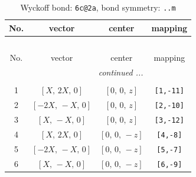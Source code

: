 \documentclass[fleqn,8pt]{jsarticle}
\begin{document}
\renewcommand{\arraystretch}{1.2}
\begin{longtable}{cccc}
\caption{Wyckoff bond: {\tt 6c@2a}, bond symmetry: {\tt ..m}}
 \\
 \hline \hline
No. & vector & center & mapping \\ \hline \endfirsthead

\multicolumn{3}{l}{\tablename\ \thetable{}} \\
 \hline \hline
No. & vector & center & mapping \\ \hline \endhead

 \hline \hline
\multicolumn{3}{r}{\footnotesize\it continued ...} \\ \endfoot

 \hline \hline
\multicolumn{3}{r}{} \\ \endlastfoot

1 & $\left[ X,\, 2 X,\, 0 \right]$ & $\left[ 0,\, 0,\, z \right]$ & {\tt [1,-11]} \\ \hline
2 & $\left[ - 2 X,\, - X,\, 0 \right]$ & $\left[ 0,\, 0,\, z \right]$ & {\tt [2,-10]} \\ \hline
3 & $\left[ X,\, - X,\, 0 \right]$ & $\left[ 0,\, 0,\, z \right]$ & {\tt [3,-12]} \\ \hline
4 & $\left[ X,\, 2 X,\, 0 \right]$ & $\left[ 0,\, 0,\, - z \right]$ & {\tt [4,-8]} \\ \hline
5 & $\left[ - 2 X,\, - X,\, 0 \right]$ & $\left[ 0,\, 0,\, - z \right]$ & {\tt [5,-7]} \\ \hline
6 & $\left[ X,\, - X,\, 0 \right]$ & $\left[ 0,\, 0,\, - z \right]$ & {\tt [6,-9]} \\
\end{longtable}
\renewcommand{\arraystretch}{1.2}
\end{document}
